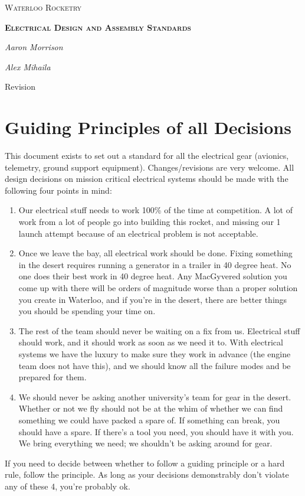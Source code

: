 \documentclass{article}
\date{\today}
\begin{document}
\begin{titlepage}
	\centering
	{\scshape\Huge Waterloo Rocketry\par}
	\vspace{1.5cm}
	{\scshape\bfseries\LARGE Electrical Design and Assembly Standards\par}
	\vspace{2cm}
	{\Large\itshape Aaron Morrison\par}
	{\Large\itshape Alex Mihaila\par}
	\vfill

	{\large \makeatletter\@date\par Revision \version}
    \par
\end{titlepage}

\section{Guiding Principles of all Decisions}
This document exists to set out a standard for all the electrical gear (avionics, telemetry, ground support equipment). Changes/revisions are very welcome. All design decisions on mission critical electrical systems should be made with the following four points in mind:

\begin{enumerate}
\item Our electrical stuff needs to work 100\% of the time at competition. A lot of work from a lot of people go into building this rocket, and missing our 1 launch attempt because of an electrical problem is not acceptable.
\item Once we leave the bay, all electrical work should be done. Fixing something in the desert requires running a generator in a trailer in 40 degree heat. No one does their best work in 40 degree heat. Any MacGyvered solution you come up with there will be orders of magnitude worse than a proper solution you create in Waterloo, and if you're in the desert, there are better things you should be spending your time on.
\item The rest of the team should never be waiting on a fix from us. Electrical stuff should work, and it should work as soon as we need it to. With electrical systems we have the luxury to make sure they work in advance (the engine team does not have this), and we should know all the failure modes and be prepared for them. 
\item We should never be asking another university's team for gear in the desert. Whether or not we fly should not be at the whim of whether we can find something we could have packed a spare of. If something can break, you should have a spare. If there's a tool you need, you should have it with you. We bring everything we need; we shouldn't be asking around for gear.
\end{enumerate}
If you need to decide between whether to follow a guiding principle or a hard rule, follow the principle. As long as your decisions demonstrably don't violate any of these 4, you're probably ok.
\end{document}
